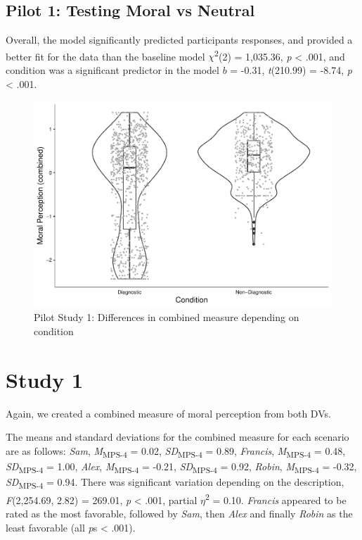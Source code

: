 \documentclass[
  american,
  man,floatsintext]{apa7}
\begin{document}
\hypertarget{pilot-1-testing-moral-vs-neutral}{%
\subsection{Pilot 1: Testing Moral vs Neutral}\label{pilot-1-testing-moral-vs-neutral}}

Overall, the model significantly predicted participants responses, and provided a better fit for the data than the baseline model \(\chi\)\textsuperscript{2}(2) = 1,035.36, \emph{p} \textless{} .001, and condition was a significant predictor in the model \(b\) = -0.31, \emph{t}(210.99) = -8.74, \emph{p} \textless{} .001.

\begin{figure}[!p]
\includegraphics{Supplementary_files/figure-latex/pilot1cobminedconditionplot-1} \caption{Pilot Study 1: Differences in combined measure depending on condition}\label{fig:pilot1cobminedconditionplot}
\end{figure}

\newpage

\hypertarget{study-1}{%
\section{Study 1}\label{study-1}}

Again, we created a combined measure of moral perception from both DVs.

The means and standard deviations for the combined measure for each scenario are as follows:
\emph{Sam},
\emph{M}\textsubscript{MPS-4} = 0.02, \emph{SD}\textsubscript{MPS-4} = 0.89,
\emph{Francis},
\emph{M}\textsubscript{MPS-4} = 0.48, \emph{SD}\textsubscript{MPS-4} = 1.00,
\emph{Alex},
\emph{M}\textsubscript{MPS-4} = -0.21, \emph{SD}\textsubscript{MPS-4} = 0.92,
\emph{Robin},
\emph{M}\textsubscript{MPS-4} = -0.32, \emph{SD}\textsubscript{MPS-4} = 0.94. There was significant variation depending on the description, \emph{F}(2,254.69, 2.82) = 269.01, \emph{p} \textless{} .001, partial \(\eta\)\textsuperscript{2} = 0.10. \emph{Francis} appeared to be rated as the most favorable, followed by \emph{Sam}, then \emph{Alex} and finally \emph{Robin} as the least favorable (all \emph{p}s \textless{} .001).
\end{document}
